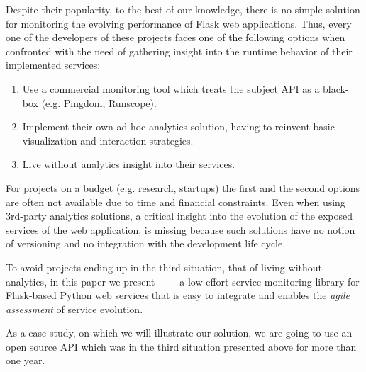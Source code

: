 \documentclass{sig-alternate-05-2015}
\begin{document}
Despite their popularity, to the best of our knowledge, there is no simple solution for monitoring the evolving performance of Flask web applications. Thus, every one of the developers of these projects faces one of the following options when confronted with the need of gathering insight into the runtime behavior of their implemented services: 

  \begin{enumerate}

    \item Use a commercial monitoring tool which treats the subject API as a black-box (e.g. Pingdom, Runscope). 

    \item Implement their own ad-hoc analytics solution, having to reinvent basic visualization and interaction strategies. 

    \item Live without analytics insight into their services.

  \end{enumerate}


For projects on a budget (e.g. research, startups) the first and the second options are often not available due to time and financial constraints. Even when using 3rd-party analytics solutions, a critical insight into the evolution of the exposed services of the web application, is missing because such solutions have no notion of versioning and no integration with the development life cycle.~\cite{papazoglou2011managing}

To avoid projects ending up in the third situation, that of living without analytics, in this paper we present \tool~ --- a low-effort service monitoring library for Flask-based Python web services that is easy to integrate and enables the {\em agile assessment} of service evolution. \cite{Nier12b}

As a case study, on which we will illustrate our solution, we are going to use an open source API which was in the third situation presented above for more than one year.

\end{document}
